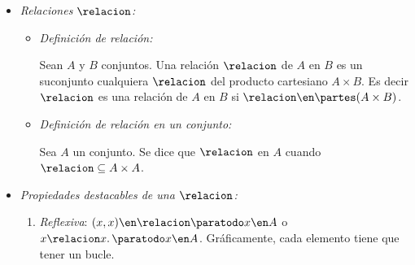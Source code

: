 \begin{itemize}[label={\tiny{}}]
\begin{center}
        \end{center}

  \item \hypertarget{teoria-1:relaciones}{\textit{Relaciones $\relacion$:}}\par
        \begin{itemize}[label=\tiny{}]
          \item
                \textit{Definición de relación: }\par
                Sean $A$ y $B$ conjuntos. Una relación $\relacion$ de $A$ en $B$ es un suconjunto
                cualquiera $\relacion$ del producto cartesiano $A \times B$. Es decir $\relacion$ es una relación
                de $A$ en $B$ si $\relacion \en \partes(A \times B)$.
          \item
                \textit{Definición de relación en un conjunto: }\par
                Sea $A$ un conjunto. Se dice que $\relacion$ en $A$ cuando $\relacion \subseteq A \times A$.
        \end{itemize}

  \item \hypertarget{teoria-1:prop-relaciones}{\textit{Propiedades destacables de una $\relacion$:}}\par
        \begin{enumerate}[label=\tiny\faIcon{poop}]
          \item  \textit{Reflexiva}: $(x, x) \en \relacion \paratodo x \en A$ o $x \relacion x.\, \paratodo x \en A$. Gráficamente,
                cada elemento tiene que tener un bucle.


\end{enumerate}
\end{itemize}
